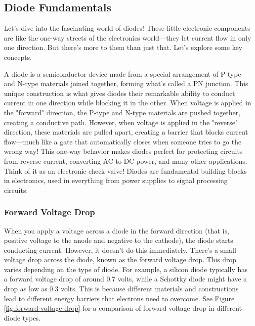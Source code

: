 \subsection{Diode Fundamentals}
\label{subsec:diodes}

Let's dive into the fascinating world of diodes! These little electronic components are like the one-way streets of the electronics world—they let current flow in only one direction. But there's more to them than just that. Let's explore some key concepts.

A diode is a semiconductor device made from a special arrangement of P-type and N-type materials joined together, forming what's called a PN junction. This unique construction is what gives diodes their remarkable ability to conduct current in one direction while blocking it in the other. When voltage is applied in the "forward" direction, the P-type and N-type materials are pushed together, creating a conductive path. However, when voltage is applied in the "reverse" direction, these materials are pulled apart, creating a barrier that blocks current flow—much like a gate that automatically closes when someone tries to go the wrong way! This one-way behavior makes diodes perfect for protecting circuits from reverse current, converting AC to DC power, and many other applications. Think of it as an electronic check valve! Diodes are fundamental building blocks in electronics, used in everything from power supplies to signal processing circuits.

\subsubsection*{Forward Voltage Drop}
When you apply a voltage across a diode in the forward direction (that is, positive voltage to the anode and negative to the cathode), the diode starts conducting current. However, it doesn't do this immediately. There's a small voltage drop across the diode, known as the forward voltage drop. This drop varies depending on the type of diode. For example, a silicon diode typically has a forward voltage drop of around 0.7 volts, while a Schottky diode might have a drop as low as 0.3 volts. This is because different materials and constructions lead to different energy barriers that electrons need to overcome. See Figure \ref{fig:forward-voltage-drop} for a comparison of forward voltage drop in different diode types. 

